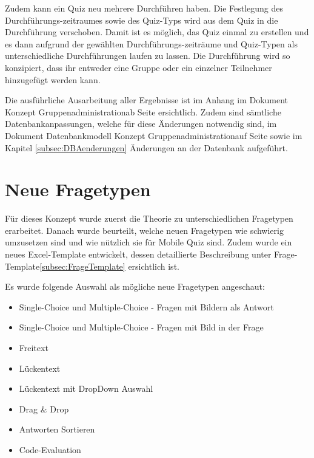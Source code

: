 Zudem kann ein Quiz neu mehrere Durchführen haben. Die Festlegung des Durchführungs-zeitraumes sowie des Quiz-Typs wird aus dem Quiz in die Durchführung verschoben. Damit ist es möglich, das Quiz einmal zu erstellen und es dann aufgrund der gewählten Durchführungs-zeiträume und Quiz-Typen als unterschiedliche Durchführungen laufen zu lassen. Die Durchführung wird so konzipiert, dass ihr entweder eine Gruppe oder ein einzelner Teilnehmer hinzugefügt werden kann. 

\bigskip

Die ausführliche Ausarbeitung aller Ergebnisse ist im Anhang im Dokument \glqq Konzept Gruppenadministration\grqq ab Seite \hyperlink{page.\getpagerefnumber{pdf:gruppenadmin}}{} ersichtlich. Zudem sind sämtliche Datenbankanpassungen, welche für diese Änderungen notwendig sind, im Dokument \glqq Datenbankmodell Konzept Gruppenadministration\grqq auf Seite \hyperlink{page.\getpagerefnumber{pdf:dbgruppenadmin}}{} sowie im Kapitel \ref{subsec:DBAenderungen} Änderungen an der Datenbank aufgeführt.


\section{Neue Fragetypen}
Für dieses Konzept wurde zuerst die Theorie zu unterschiedlichen Fragetypen erarbeitet. Danach wurde beurteilt, welche neuen Fragetypen wie schwierig umzusetzen sind und wie nützlich sie für Mobile Quiz sind. Zudem wurde ein neues Excel-Template entwickelt, dessen detaillierte Beschreibung unter \glqq Frage-Template\grqq  \ref{subsec:FrageTemplate} ersichtlich ist.

\bigskip

\noindent Es wurde folgende Auswahl als mögliche neue Fragetypen angeschaut:
\begin{itemize}
	\item Single-Choice und Multiple-Choice - Fragen mit Bildern als Antwort
	\item Single-Choice und Multiple-Choice - Fragen mit Bild in der Frage
	\item Freitext
	\item Lückentext
	\item Lückentext mit DropDown Auswahl
	\item Drag \& Drop
	\item Antworten Sortieren
	\item Code-Evaluation
\end{itemize}

